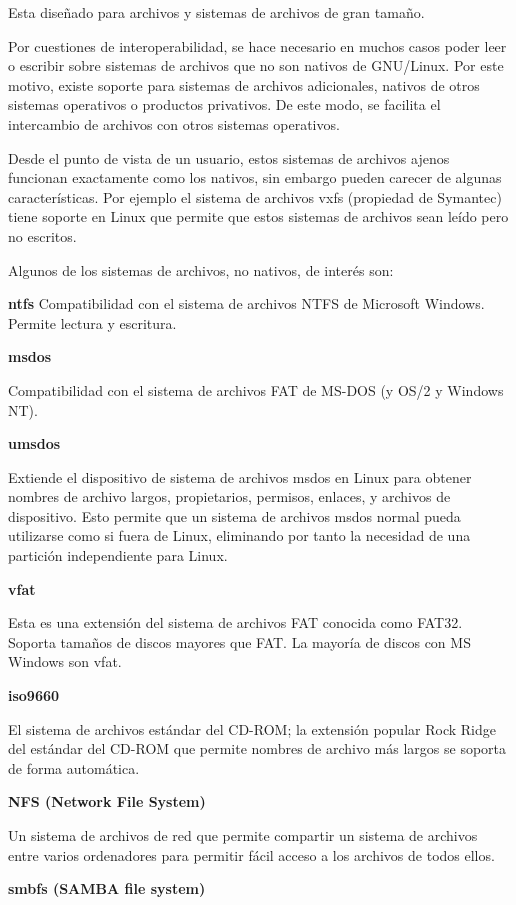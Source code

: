\documentclass[12pt]{article}
\begin{document}
Esta diseñado para archivos y sistemas de archivos de gran tamaño.

Por cuestiones de interoperabilidad, se hace necesario en muchos casos
poder leer o escribir sobre sistemas de archivos que no son nativos de 
GNU/Linux. Por este motivo, existe soporte para sistemas de archivos 
adicionales, nativos de otros sistemas operativos o productos privativos. 
De este modo, se facilita el intercambio de archivos con otros sistemas 
operativos. 

Desde el punto de vista de un usuario, estos sistemas de archivos ajenos 
funcionan exactamente como los nativos, sin embargo pueden carecer de 
algunas características. Por ejemplo el sistema de archivos vxfs (propiedad
de Symantec) tiene soporte en Linux que permite que estos sistemas de 
archivos sean leído pero no escritos. 

Algunos de los sistemas de archivos, no nativos, de interés son: 

{\bf ntfs} 
    Compatibilidad con el sistema de archivos NTFS de Microsoft Windows. 
Permite lectura y escritura. 

{\bf msdos}

    Compatibilidad con el sistema de archivos FAT de MS-DOS (y OS/2 y Windows NT).

{\bf umsdos}

    Extiende el dispositivo de sistema de archivos msdos en Linux para obtener nombres de archivo largos, propietarios, permisos, enlaces, y archivos de dispositivo. Esto permite que un sistema de archivos msdos normal pueda utilizarse como si fuera de Linux, eliminando por tanto la necesidad de una partición independiente para Linux.

{\bf vfat}

    Esta es una extensión del sistema de archivos FAT conocida como FAT32. Soporta tamaños de discos mayores que FAT. La mayoría de discos con MS Windows son vfat.

{\bf iso9660}

    El sistema de archivos estándar del CD-ROM; la extensión popular Rock Ridge del estándar del CD-ROM que permite nombres de archivo más largos se soporta de forma automática.

{\bf NFS (Network File System)}

    Un sistema de archivos de red que permite compartir un sistema de archivos entre varios ordenadores para permitir fácil acceso a los archivos de todos ellos.

{\bf smbfs (SAMBA file system)}
\end{document}
